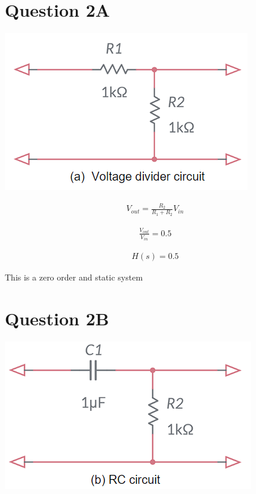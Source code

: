 \documentclass{article}
\begin{document}
\section{Question 2A}

\begin{center}
    \includegraphics[scale=0.7]{2a.png}

\end{center}

\begin{equation*}
    \begin{aligned}
        V_{out} = \frac{R_2}{R_1 + R_2} V_{in}
    \end{aligned}
\end{equation*}

\begin{equation*}
    \begin{aligned}
        \frac{V_{out}}{V_{in}} = 0.5
    \end{aligned}
\end{equation*}

\begin{equation*}
    \begin{aligned}
        H(s) = 0.5
    \end{aligned}
\end{equation*}

This is a zero order and static system

\section{Question 2B}
\begin{center}
    \includegraphics[scale=0.7]{2b.png}

\end{center}
\end{document}
